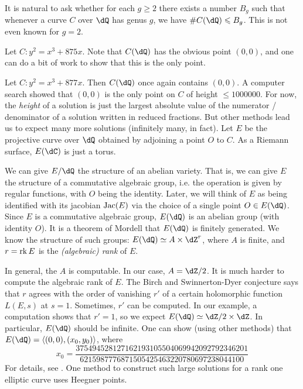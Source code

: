 \documentclass{article}
\begin{document}
It is natural to ask whether for each $g\geqslant 2$ there exists a number 
$B_g$ such that whenever a curve $C$ over $\dQ$ has genus $g$, we have 
$\# C(\dQ)\leqslant B_g$. This is not even known for $g=2$. 

\begin{example}
Let $C:y^2=x^3+875 x$. Note that $C(\dQ)$ has the obvious point 
$(0,0)$, and one can do a bit of work to show that this is the only point. 
\end{example}

\begin{example}
Let $C:y^2=x^3+877 x$. Then $C(\dQ)$ once again contains $(0,0)$. A 
computer search showed that $(0,0)$ is the only point on $C$ of height 
$\leqslant 1000000$. For now, the \emph{height} of a solution is just the 
largest absolute value of the numerator / denominator of a solution written 
in reduced fractions. But other methods lead us to expect many more solutions
(infinitely many, in fact). Let $E$ be the projective curve over $\dQ$ obtained 
by adjoining a point $O$ to $C$. As a Riemann surface, $E(\dC)$ is just a 
torus. 

We can give $E/\dQ$ the 
structure of an abelian variety. That is, we can give $E$ the structure of a 
commutative algebraic group, i.e. the operation is given by regular  
functions, with $O$ being the identity. Later, we will think of $E$ as 
being identified with its jacobian $\operatorname{Jac}(E)$ via the choice of a single point 
$O\in E(\dQ)$. Since $E$ is a commutative algebraic group, $E(\dQ)$ is an 
abelian group (with identity $O$). It is a theorem of Mordell that $E(\dQ)$ is 
finitely generated. We know the structure of such groups: 
$E(\dQ)\simeq A\times \dZ^r$, where $A$ is finite, and $r=\operatorname{rk} E$ 
is the \emph{(algebraic) rank} of $E$. 

In general, the $A$ is computable. In our case, $A=\dZ/2$. It is much harder to 
compute the algebraic rank of $E$. The Birch and Swinnerton-Dyer 
conjecture says that $r$ agrees with the order of vanishing $r'$ of a certain 
holomorphic function $L(E,s)$ at $s=1$. Sometimes, $r'$ can be computed.  
In our example, a computation shows that $r'=1$, so we expect 
$E(\dQ)\simeq \dZ/2\times\dZ$. In particular, 
$E(\dQ)$ should be infinite. One can show (using other methods) that 
$E(\dQ)=\langle (0,0),(x_0,y_0)\rangle$, where 
\[
  x_0 = \frac{37 5494 5281 2716 2193 1055 0406 9942 0927 9234 6201}{6215 9877 7687 1505 4254 6322 0780 6972 3804 4100}
\]
For details, see \cite{br84}. One method to construct such large solutions for 
a rank one elliptic curve uses Heegner points. 
\end{example}
\end{document}
